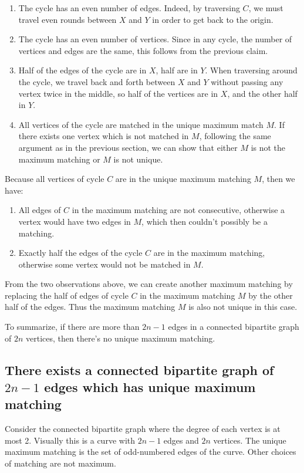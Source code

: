 \begin{enumerate}
  \item The cycle has an even number of edges. Indeed, by traversing $C$, we must travel even rounds between $X$ and $Y$ in order to get back to the origin.
  \item The cycle has an even number of vertices. Since in any cycle, the number of vertices and edges are the same, this follows from the previous claim.
  \item Half of the edges of the cycle are in $X$, half are in $Y$. When traversing around the cycle, we travel back and forth between $X$ and $Y$ without passing any vertex twice in the middle, so half of the vertices are in $X$, and the other half in $Y$.
  \item All vertices of the cycle are matched in the unique maximum match $M$. If there exists one vertex which is not matched in $M$, following the same argument as in the previous section, we can show that either $M$ is not the maximum matching or $M$ is not unique.
\end{enumerate}

Because all vertices of cycle $C$ are in the unique maximum matching $M$, then we have:

\begin{enumerate}
  \item All edges of $C$ in the maximum matching are not consecutive, otherwise a vertex would have two edges in $M$, which then couldn't possibly be a matching.
  \item Exactly half the edges of the cycle $C$ are in the maximum matching, otherwise some vertex would not be matched in $M$.
\end{enumerate}

From the two observations above, we can create another maximum matching by replacing the half of edges of cycle $C$ in the maximum matching $M$ by the other half of the edges. Thus the maximum matching $M$ is also not unique in this case.

To summarize, if there are more than $2n-1$ edges in a connected bipartite graph of $2n$ vertices, then there's no unique maximum matching.

\subsection{There exists a connected bipartite graph of $2n-1$ edges which has unique maximum matching}

Consider the connected bipartite graph where the degree of each vertex is at most 2. Visually this is a curve with $2n-1$ edges and $2n$ vertices. The unique maximum matching is the set of odd-numbered edges of the curve. Other choices of matching are not maximum.
